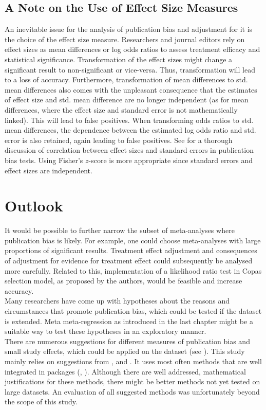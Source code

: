 \documentclass[11pt,a4paper,twoside]{book}\usepackage[]{graphicx}\usepackage[]{color}
\begin{document}
\subsection{A Note on the Use of Effect Size Measures}
An inevitable issue for the analysis of publication bias and adjustment for it is the choice of the effect size measure. Researchers and journal editors rely on effect sizes as mean differences or log odds ratios to assess treatment efficacy and statistical significance. Transformation of the effect sizes might change a significant result to non-significant or vice-versa. Thus, transformation will lead to a loss of accuracy. Furthermore, transformation of mean differences to std. mean differences also comes with the unpleasant consequence that the estimates of effect size and std. mean difference are no longer independent (as for mean differences, where the effect size and standard error is not mathematically linked). This will lead to false positives. When transforming odds ratios to std. mean differences, the dependence between the estimated log odds ratio and std. error is also retained, again leading to false positives. See \citet{deeks.2005} for a thorough discussion of correlation between effect sizes and standard errors in publication bias tests. Using Fisher's $z$-score is more appropriate since standard errors and effect sizes are independent.\\



\section{Outlook}
It would be possible to further narrow the subset of meta-analyses where publication bias is likely. For example, one could choose meta-analyses with large proportions of significant results. Treatment effect adjustment and consequences of adjustment for evidence for treatment effect could subsequently be analysed more carefully. Related to this, implementation of a likelihood ratio test in Copas selection model, as proposed by the authors, would be feasible and increase accuracy. \\
Many researchers have come up with hypotheses about the reasons and circumstances that promote publication bias, which could be tested if the dataset is extended. Meta meta-regression as introduced in the last chapter might be a suitable way to test these hypotheses in an exploratory manner.\\
There are numerous suggestions for different measures of publication bias and small study effects, which could be applied on the dataset (see \citealp{mueller.2016}). This study mainly relies on suggestions from \citet{Sterne}, \citet{Ioannidis2007} and \citet{limitmeta}. It uses most often methods that are well integrated in packages (\citealp{metafor.package}, \citealp{meta.package}). Although there are well addressed, mathematical justifications for these methods, there might be better methods not yet tested on large datasets. An evaluation of all suggested methods was unfortunately beyond the scope of this study.
\end{document}
